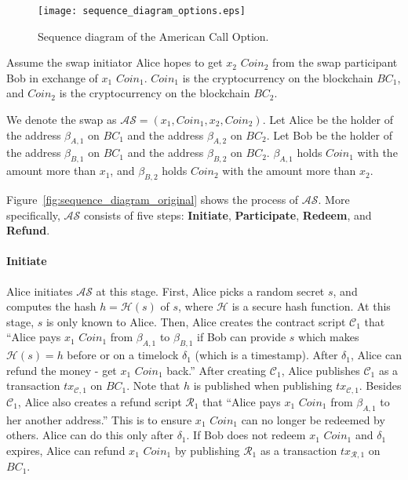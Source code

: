 \begin{figure}
    \texttt{[image: sequence\_diagram\_options.eps]}
    \caption{Sequence diagram of the American Call Option.}
    \label{fig:sequence_diagram_option}
\end{figure}



Assume the swap initiator Alice hopes to get $x_2$ $Coin_2$ from the swap participant Bob in exchange of $x_1$ $Coin_1$. 
$Coin_1$ is the cryptocurrency on the blockchain $BC_1$, and $Coin_2$ is the cryptocurrency on the blockchain $BC_2$.

We denote the swap as $\mathcal{AS} = (x_1, Coin_1, x_2, Coin_2)$.
Let Alice be the holder of the address $\beta_{A, 1}$ on $BC_1$ and the address $\beta_{A, 2}$ on $BC_2$.
Let Bob be the holder of the address $\beta_{B, 1}$ on $BC_1$ and the address $\beta_{B, 2}$ on $BC_2$.
$\beta_{A, 1}$ holds $Coin_1$ with the amount more than $x_1$, and $\beta_{B, 2}$ holds $Coin_2$ with the amount more than $x_2$.

Figure~\ref{fig:sequence_diagram_original} shows the process of $\mathcal{AS}$.
More specifically, $\mathcal{AS}$ consists of five steps:
\textbf{Initiate},
\textbf{Participate},
\textbf{Redeem}, and
\textbf{Refund}.


\paragraph{\textbf{Initiate}}
Alice initiates $\mathcal{AS}$ at this stage.
First, Alice picks a random secret $s$, and computes the hash $h = \mathcal{H}(s)$ of $s$, where $\mathcal{H}$ is a secure hash function.
At this stage, $s$ is only known to Alice.
Then, Alice creates the contract script $\mathcal{C}_1$ that ``Alice pays $x_1$ $Coin_1$ from $\beta_{A, 1}$ to $\beta_{B, 1}$ if Bob can provide $s$ which makes $\mathcal{H}(s) = h$ before or on a timelock $\delta_1$ (which is a timestamp). After $\delta_1$, Alice can refund the money - get $x_1$ $Coin_1$ back.''
After creating $\mathcal{C}_1$, Alice publishes $\mathcal{C}_1$ as a transaction $tx_{\mathcal{C}, 1}$ on $BC_1$.
Note that $h$ is published when publishing $tx_{\mathcal{C}, 1}$.
Besides $\mathcal{C}_1$, Alice also creates a refund script $\mathcal{R}_1$ that ``Alice pays $x_1$ $Coin_1$ from $\beta_{A, 1}$ to her another address.'' This is to ensure $x_1$ $Coin_1$ can no longer be redeemed by others. Alice can do this only after $\delta_1$.
If Bob does not redeem $x_1$ $Coin_1$ and $\delta_1$ expires, Alice can refund $x_1$ $Coin_1$ by publishing $\mathcal{R}_1$ as a transaction $tx_{\mathcal{R}, 1}$ on $BC_1$.

